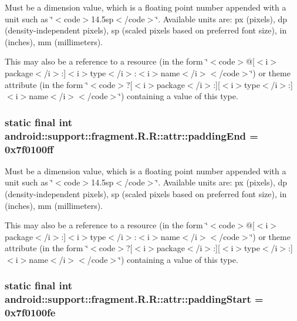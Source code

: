 Must be a dimension value, which is a floating point number appended with a unit such as \char`\"{}$<$code$>$14.5sp$<$/code$>$\char`\"{}. Available units are: px (pixels), dp (density-independent pixels), sp (scaled pixels based on preferred font size), in (inches), mm (millimeters). 

This may also be a reference to a resource (in the form \char`\"{}$<$code$>$@\mbox{[}$<$i$>$package$<$/i$>$:\mbox{]}$<$i$>$type$<$/i$>$:$<$i$>$name$<$/i$>$$<$/code$>$\char`\"{}) or theme attribute (in the form \char`\"{}$<$code$>$?\mbox{[}$<$i$>$package$<$/i$>$:\mbox{]}\mbox{[}$<$i$>$type$<$/i$>$:\mbox{]}$<$i$>$name$<$/i$>$$<$/code$>$\char`\"{}) containing a value of this type. \hypertarget{classandroid_1_1support_1_1fragment_1_1_r_1_1attr_96d785f04ac6a048962ec60154e95a7d}{
\subsubsection[{paddingEnd}]{\setlength{\rightskip}{0pt plus 5cm}static final int android::support::fragment.R.R::attr::paddingEnd = 0x7f0100ff}}
\label{classandroid_1_1support_1_1fragment_1_1_r_1_1attr_96d785f04ac6a048962ec60154e95a7d}


Must be a dimension value, which is a floating point number appended with a unit such as \char`\"{}$<$code$>$14.5sp$<$/code$>$\char`\"{}. Available units are: px (pixels), dp (density-independent pixels), sp (scaled pixels based on preferred font size), in (inches), mm (millimeters). 

This may also be a reference to a resource (in the form \char`\"{}$<$code$>$@\mbox{[}$<$i$>$package$<$/i$>$:\mbox{]}$<$i$>$type$<$/i$>$:$<$i$>$name$<$/i$>$$<$/code$>$\char`\"{}) or theme attribute (in the form \char`\"{}$<$code$>$?\mbox{[}$<$i$>$package$<$/i$>$:\mbox{]}\mbox{[}$<$i$>$type$<$/i$>$:\mbox{]}$<$i$>$name$<$/i$>$$<$/code$>$\char`\"{}) containing a value of this type. \hypertarget{classandroid_1_1support_1_1fragment_1_1_r_1_1attr_5c5438e7bfa4d6eb0fddf3cd5fe9fb8a}{
\subsubsection[{paddingStart}]{\setlength{\rightskip}{0pt plus 5cm}static final int android::support::fragment.R.R::attr::paddingStart = 0x7f0100fe}}
\label{classandroid_1_1support_1_1fragment_1_1_r_1_1attr_5c5438e7bfa4d6eb0fddf3cd5fe9fb8a}


